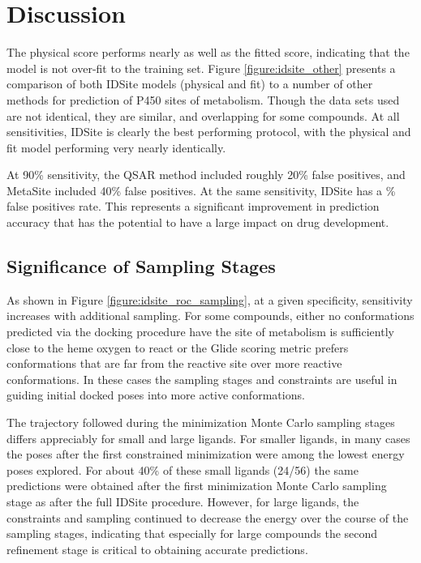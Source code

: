 \section{Discussion}
\label{section:p450/discussion}
The physical score performs nearly as well as the fitted score, indicating that the model is not over-fit to the training set.
Figure \ref{figure:idsite_other} presents a comparison of both IDSite models (physical and fit) to a number of other methods for prediction of P450 sites of metabolism.
Though the data sets used are not identical, they are similar, and overlapping for some compounds.
At all sensitivities, IDSite is clearly the best performing protocol, with the physical and fit model performing very nearly identically.

At 90\% sensitivity, the QSAR method included roughly 20\% false positives, and MetaSite included 40\% false positives.
At the same sensitivity, IDSite has a \% false positives rate.
This represents a significant improvement in prediction accuracy that has the potential to have a large impact on drug development.

\subsection{Significance of Sampling Stages}
\label{subsection:p450/discussion/sampling_stages}

As shown in Figure \ref{figure:idsite_roc_sampling}, at a given specificity, sensitivity increases with additional sampling.
For some compounds, either no conformations predicted via the docking procedure have the site of metabolism is sufficiently close to the heme oxygen to react or the Glide scoring metric prefers conformations that are far from the reactive site over more reactive conformations.
In these cases the sampling stages and constraints are useful in guiding initial docked poses into more active conformations.

The trajectory followed during the minimization Monte Carlo sampling stages differs appreciably for small and large ligands.
For smaller ligands, in many cases the poses after the first constrained minimization were among the lowest energy poses explored.
For about 40\% of these small ligands (24/56) the same predictions were obtained after the first minimization Monte Carlo sampling stage as after the full IDSite procedure.
However, for large ligands, the constraints and sampling continued to decrease the energy over the course of the sampling stages, indicating that especially for large compounds the second refinement stage is critical to obtaining accurate predictions.

